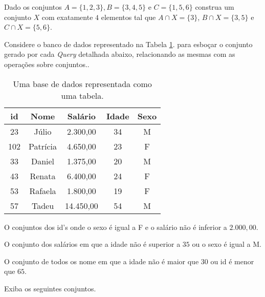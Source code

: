 \begin{problem}\label{prob:Conjuntos12}
	Dado os conjuntos $A = \{1, 2, 3\}, B = \{3,4,5\}$ e $C = \{1, 5, 6\}$ construa um conjunto $X$ com exatamente $4$ elementos tal que $A \cap X = \{3\}$, $B \cap X =\{3, 5\}$ e $C \cap X = \{5, 6\}$.
\end{problem}

\begin{problem}\label{prob:Conjuntos13}
	Considere o banco de dados representado na Tabela  \ref{tab:TabelaBaseDeDados1}. para esboçar o conjunto gerado por cada  \textit{Query} detalhada abaixo, relacionando as mesmas com as operações sobre conjuntos..
\end{problem}

\begin{table}[h]
	\centering
	\begin{tabular}{ccccc}
		\hline
		id & Nome & Salário & Idade & Sexo \\
		\hline
		23 & Júlio & 2.300,00 & 34 & M \\
		102 & Patrícia & 4.650,00 & 23 & F \\
		33 & Daniel & 1.375,00 & 20 & M \\
		43 & Renata & 6.400,00 & 24 & F \\
		53 & Rafaela & 1.800,00 & 19 & F \\
		57 & Tadeu & 14.450,00 & 54 & M \\
		\hline
	\end{tabular}
	\caption{Uma base de dados representada como uma tabela.}
	\label{tab:TabelaBaseDeDados1}
\end{table}

\begin{exerList}
	\item O conjuntos dos id's onde o sexo é igual a F e o salário não é inferior a $2.000,00$.
	\item O conjunto dos salários em que a idade não é superior a $35$ ou o sexo é igual a M.
	\item O conjunto de todos os nome em que a idade não é maior que $30$ ou id é menor que $65$.
\end{exerList}

\begin{problem}\label{prob:Conjuntos14}
	Exiba os seguintes conjuntos.
\end{problem}

